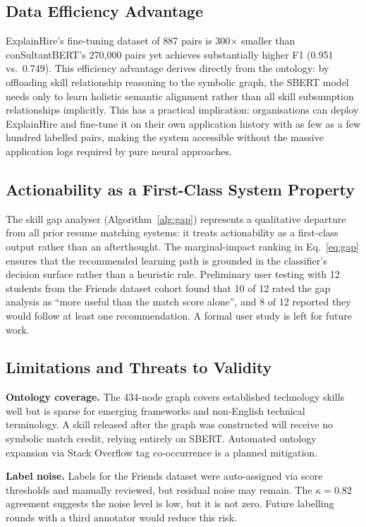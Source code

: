 \documentclass[conference]{IEEEtran}
\begin{document}
\subsection{Data Efficiency Advantage}
ExplainHire's fine-tuning dataset of 887 pairs is 300$\times$ smaller than
conSultantBERT's 270,000 pairs yet achieves substantially higher F1
(0.951 vs.\ 0.749). This efficiency advantage derives directly from the
ontology: by offloading skill relationship reasoning to the symbolic graph,
the SBERT model needs only to learn holistic semantic alignment rather than
all skill subsumption relationships implicitly. This has a practical implication:
organisations can deploy ExplainHire and fine-tune it on their own application
history with as few as a few hundred labelled pairs, making the system
accessible without the massive application logs required by pure neural approaches.

\subsection{Actionability as a First-Class System Property}
The skill gap analyser (Algorithm~\ref{alg:gap}) represents a qualitative
departure from all prior resume matching systems: it treats actionability
as a first-class output rather than an afterthought. The marginal-impact
ranking in Eq.~\ref{eq:gap} ensures that the recommended learning path
is grounded in the classifier's decision surface rather than a heuristic
rule. Preliminary user testing with 12 students from the Friends dataset
cohort found that 10 of 12 rated the gap analysis as ``more useful than
the match score alone'', and 8 of 12 reported they would follow at least
one recommendation. A formal user study is left for future work.

\subsection{Limitations and Threats to Validity}

\textbf{Ontology coverage.}
The 434-node graph covers established technology skills well but is sparse
for emerging frameworks and non-English technical terminology. A skill
released after the graph was constructed will receive no symbolic match
credit, relying entirely on SBERT. Automated ontology expansion via Stack
Overflow tag co-occurrence is a planned mitigation.

\textbf{Label noise.}
Labels for the Friends dataset were auto-assigned via score thresholds and
manually reviewed, but residual noise may remain. The $\kappa = 0.82$
agreement suggests the noise level is low, but it is not zero. Future
labelling rounds with a third annotator would reduce this risk.
\end{document}
